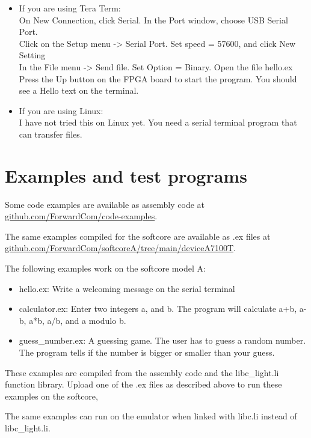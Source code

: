 \documentclass[11pt,a4paper,oneside,openright]{report}
\newcommand{\vv}{ \vspace{2mm} }   %
\begin{document}
\begin{itemize}
\item If you are using Tera Term: \\ 
On New Connection, click Serial. In the Port window, choose USB Serial Port. \\
Click on the Setup menu -> Serial Port. Set speed = 57600, and click New Setting\\
In the File menu -> Send file. Set Option = Binary. Open the file hello.ex \\
Press the Up button on the FPGA board to start the program. You should see a Hello text on the terminal.
\item If you are using Linux: \\ 
I have not tried this on Linux yet. You need a serial terminal program that can transfer files.
\end{itemize}


\chapter{Examples and test programs}
Some code examples are available as assembly code at \\
\href{https://github.com/ForwardCom/code-examples}{github.com/ForwardCom/code-examples}.
\vv

The same examples compiled for the softcore are available as .ex files at \\
\href{https://github.com/ForwardCom/softcoreA/tree/main/deviceA7100T}{github.com/ForwardCom/softcoreA/tree/main/deviceA7100T}.
\vv

The following examples work on the softcore model A:
\begin{itemize}
\item hello.ex: Write a welcoming message on the serial terminal
\item calculator.ex: Enter two integers a, and b. The program will calculate a+b, a-b, a*b, a/b, and a modulo b.
\item guess\_number.ex: A guessing game. The user has to guess a random number. The program tells if the number is bigger or smaller than your guess.
\end{itemize}

These examples are compiled from the assembly code and the libc\_light.li function library. Upload one of the .ex files as described above to run these examples on the softcore, 
\vv

The same examples can run on the emulator when linked with libc.li instead of libc\_light.li.
\end{document}
